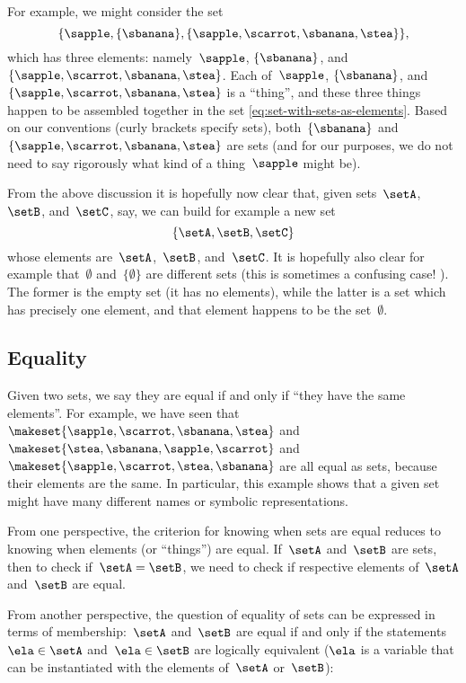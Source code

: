 For example, we might consider the set
%
\begin{equation}\label{eq:set-with-sets-as-elements}
    \{ \sapple, \{ \sbanana \}, \{ \sapple, \scarrot, \sbanana, \stea \} \},
\end{equation}
%
which has three elements: namely~$\sapple$, $\{ \sbanana \}$, and~$\{ \sapple, \scarrot, \sbanana, \stea \}$.
Each of~$\sapple$, $\{ \sbanana \}$, and~$\{ \sapple, \scarrot, \sbanana, \stea \}$ is a ``thing'', and these three things happen to be assembled together in the set \cref{eq:set-with-sets-as-elements}.
Based on our conventions (curly brackets specify sets), both~$\{ \sbanana \}$ and~$\{ \sapple, \scarrot, \sbanana, \stea \}$ are sets (and for our purposes, we do not need to say rigorously what kind of a thing~$\sapple$ might be).

From the above discussion it is hopefully now clear that, given sets~$\setA$,~$\setB$, and~$\setC$, say, we can build for example a new set
\begin{equation*}
    \{ \setA, \setB, \setC \}
\end{equation*}
whose elements are~$\setA$,~$\setB$, and~$\setC$.
It is hopefully also clear for example that~$\emptyset$ and~$\{ \emptyset \}$ are different sets (this is sometimes a confusing case!
).
The former is the empty set (it has no elements), while the latter is a set which has precisely one element, and that element happens to be the set~$\emptyset$.

\subsection{Equality}

Given two sets, we say they are equal if and only if ``they have the same elements''.
For example, we have seen that~$\makeset{ \sapple, \scarrot, \sbanana, \stea }$ and~$\makeset{ \stea, \sbanana, \sapple, \scarrot}$ and~$\makeset{ \sapple, \scarrot, \stea, \sbanana }$ are all equal as sets, because their elements are the same.
In particular, this example shows that a given set might have many different names or symbolic representations.

From one perspective, the criterion for knowing when sets are equal reduces to knowing when elements (or ``things'') are equal.
If~$\setA$ and~$\setB$ are sets, then to check if~$\setA = \setB$, we need to check if respective elements of~$\setA$ and~$\setB$ are equal.

From another perspective, the question of equality of sets can be expressed in terms of membership:~$\setA$ and~$\setB$ are equal if and only if the statements~$\ela \in \setA$ and~$\ela \in \setB$ are logically equivalent ($\ela$ is a variable that can be instantiated with the elements of~$\setA$ or~$\setB$):

